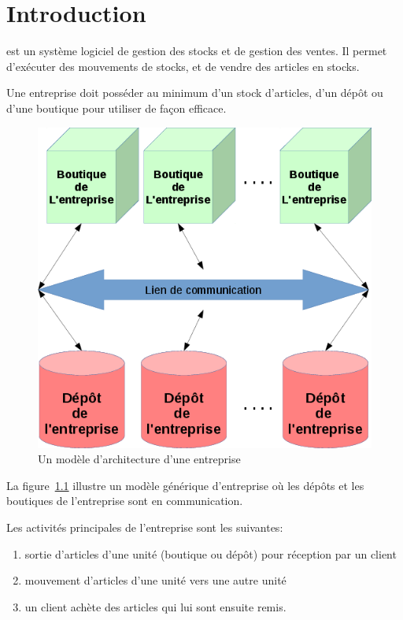 \chapter{Introduction}\label{chap:introduction}

\yeren est un syst\`eme logiciel de gestion des
stocks et de gestion des ventes. Il permet
d'ex\'ecuter des mouvements de stocks, et de
vendre des articles en stocks.

Une entreprise doit poss\'eder au minimum d'un stock
d'articles, d'un d\'ep\^ot ou d'une boutique pour utiliser
\yeren de fa\c{c}on efficace.\\

\begin{figure}[!htpb]
	\centering
	\includegraphics[scale=0.63]{images/architecture-enterprise-yeren.png}
	\caption{Un mod\`ele d'architecture d'une entreprise}\label{fig:architecture-enterprise-yeren}
\end{figure}

La figure~\ref{fig:architecture-enterprise-yeren} illustre
un mod\`ele g\'en\'erique d'entreprise o\`u les d\'ep\^ots
et les boutiques de l'entreprise sont en communication.

Les activit\'es principales de l'entreprise sont les suivantes:
\begin{enumerate}[1)]
	\item {} sortie d'articles
		d'une unit\'e (boutique ou d\'ep\^ot) pour r\'eception par un client
	\item {} mouvement d'articles
		d'une unit\'e vers une autre unit\'e
	\item {} un client ach\`ete
		des articles qui lui sont ensuite remis.\\
\end{enumerate}

